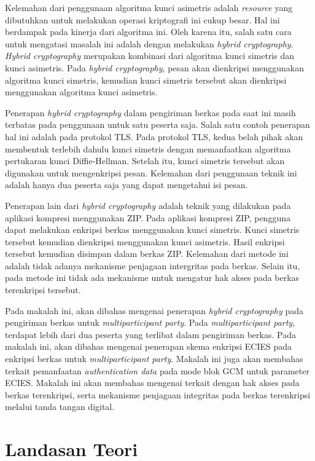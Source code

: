 \documentclass[conference]{IEEEtran}
\begin{document}
Kelemahan dari penggunaan algoritma kunci asimetris adalah \emph{resource} yang dibutuhkan untuk melakukan operasi kriptografi ini cukup besar. Hal ini berdampak pada kinerja dari algoritma ini. Oleh karena itu, salah satu cara untuk mengatasi masalah ini adalah dengan melakukan \emph{hybrid cryptography}. \emph{Hybrid cryptography} merupakan kombinasi dari algoritma kunci simetris dan kunci asimetris. Pada \emph{hybrid cryptography}, pesan akan dienkripsi menggunakan algoritma kunci simetris, kemudian kunci simetris tersebut akan dienkripsi menggunakan algoritma kunci asimetris.

Penerapan \emph{hybrid cryptography} dalam pengiriman berkas pada saat ini masih terbatas pada penggunaan untuk satu peserta saja. Salah satu contoh penerapan hal ini adalah pada protokol TLS. Pada protokol TLS, kedua belah pihak akan membentuk terlebih dahulu kunci simetris dengan memanfaatkan algoritma pertukaran kunci Diffie-Hellman. Setelah itu, kunci simetris tersebut akan digunakan untuk mengenkripsi pesan. Kelemahan dari penggunaan teknik ini adalah hanya dua peserta saja yang dapat mengetahui isi pesan. 

Penerapan lain dari \emph{hybrid cryptography} adalah teknik yang dilakukan pada aplikasi kompresi menggunakan ZIP. Pada aplikasi kompresi ZIP, pengguna dapat melakukan enkripsi berkas menggunakan kunci simetris. Kunci simetris tersebut kemudian dienkripsi menggunakan kunci asimetris. Hasil enkripsi tersebut kemudian disimpan dalam berkas ZIP. Kelemahan dari metode ini adalah tidak adanya mekanisme penjagaan intergritas pada berkas. Selain itu, pada metode ini tidak ada mekanisme untuk mengatur hak akses pada berkas terenkripsi tersebut.

Pada makalah ini, akan dibahas mengenai penerapan \emph{hybrid cryptography} pada pengiriman berkas untuk \emph{multiparticipant party}. Pada \emph{multiparticipant party}, terdapat lebih dari dua peserta yang terlibat dalam pengiriman berkas. Pada makalah ini, akan dibahas mengenai penerapan skema enkripsi ECIES pada enkripsi berkas untuk \emph{multiparticipant party}. Makalah ini juga akan membahas terkait pemanfaatan \emph{authentication data} pada mode blok GCM untuk parameter ECIES. Makalah ini akan membahas mengenai terkait dengan hak akses pada berkas terenkripsi, serta mekanisme penjagaan integritas pada berkas terenkripsi melalui tanda tangan digital.

\section{Landasan Teori}
\end{document}
